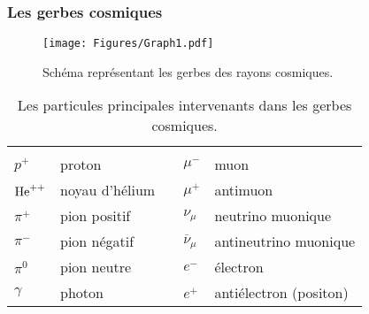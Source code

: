 \documentclass[a4paper, 12pt]{article}
\begin{document}
\begin{spacing}{1.5}
\subsubsection{Les gerbes cosmiques}

\begin{figure}[t]
\begin{center}
\texttt{[image: Figures/Graph1.pdf]} 
\end{center}
\vspace{-0.8cm}
\caption{\label{fig:GerbesCosmiquesG1} Schéma représentant les gerbes des rayons cosmiques.}
\end{figure}
\begin{table}[t]
\begin{center}
\begin{tabular}{lllll}
  \hline
  &&&&\\[-0.3cm]
  $p^+$ & proton &\hspace{2cm} & $\mu^-$ & muon\\[0.1cm]
  ${\rm {He}^{++}}$ & noyau d'hélium & & $\mu^+$ & antimuon\\[0.1cm]
  $\pi^+$ & pion positif & & $\nu_\mu$ & neutrino muonique\\[0.1cm]
  $\pi^-$ & pion négatif & & ${\overline \nu}_\mu$ & antineutrino muonique\\[0.1cm]
  $\pi^0$ & pion neutre & & $e^-$ & électron\\[0.1cm]
  $\gamma$ & photon & & $e^+$ & antiélectron (positon)\\[0.2cm]
  \hline
\end{tabular}
\end{center}
\vspace{-0.3cm}
\caption{\label{tab:TableGerbesCosmiquesNoyaux} Les particules principales intervenants dans les gerbes cosmiques.}
\end{table}

\end{spacing}
\end{document}
